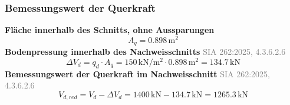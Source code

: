 \documentclass[11pt,a4paper]{article}
\newcommand{\normref}[1]{{\small\textcolor{gray}{#1}}}
\begin{document}
\subsubsection{Bemessungswert der Querkraft}
\noindent\textbf{Fläche innerhalb des Schnitts, ohne Aussparungen}
\begin{equation*}
A_q = 0.898\,\mathrm{m}^{2}
\end{equation*}
\noindent\textbf{Bodenpressung innerhalb des Nachweisschnitts} \hfill \normref{SIA 262:2025, 4.3.6.2.6}
\begin{equation*}
\Delta V_d = q_d \cdot A_q = 150\,\mathrm{kN}/\mathrm{m}^{2} \cdot 0.898\,\mathrm{m}^{2} = 134.7\,\mathrm{kN}
\end{equation*}
\noindent\textbf{Bemessungswert der Querkraft im Nachweisschnitt} \hfill \normref{SIA 262:2025, 4.3.6.2.6}
\begin{equation*}
V_{d,red} = V_d - \Delta V_d = 1400\,\mathrm{kN} - 134.7\,\mathrm{kN} = 1265.3\,\mathrm{kN}
\end{equation*}
\end{document}
